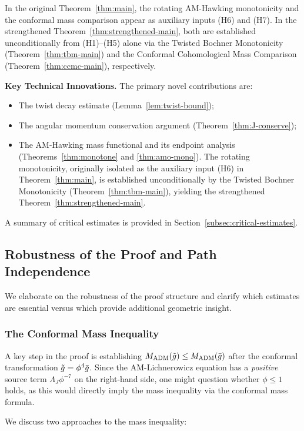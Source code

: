 In the original Theorem~\ref{thm:main}, the rotating AM-Hawking monotonicity and the conformal mass comparison appear as auxiliary inputs (H6) and (H7). In the strengthened Theorem~\ref{thm:strengthened-main}, both are established unconditionally from (H1)--(H5) alone via the Twisted Bochner Monotonicity (Theorem~\ref{thm:tbm-main}) and the Conformal Cohomological Mass Comparison (Theorem~\ref{thm:ccmc-main}), respectively.

\textbf{Key Technical Innovations.} The primary novel contributions are:
\begin{itemize}
    \item The twist decay estimate (Lemma~\ref{lem:twist-bound});
    \item The angular momentum conservation argument (Theorem~\ref{thm:J-conserve});
    \item The AM-Hawking mass functional and its endpoint analysis (Theorems~\ref{thm:monotone} and \ref{thm:amo-mono}). The rotating monotonicity, originally isolated as the auxiliary input (H6) in Theorem~\ref{thm:main}, is established unconditionally by the Twisted Bochner Monotonicity (Theorem~\ref{thm:tbm-main}), yielding the strengthened Theorem~\ref{thm:strengthened-main}.
\end{itemize}
A summary of critical estimates is provided in Section~\ref{subsec:critical-estimates}.

\subsection{Robustness of the Proof and Path Independence}\label{subsec:proof-robustness}

We elaborate on the robustness of the proof structure and clarify which estimates are essential versus which provide additional geometric insight.

\subsubsection{The Conformal Mass Inequality}

A key step in the proof is establishing $M_{\mathrm{ADM}}(\tilde{g}) \leq M_{\mathrm{ADM}}(\bar{g})$ after the conformal transformation $\tilde{g} = \phi^4 \bar{g}$. Since the AM-Lichnerowicz equation has a \emph{positive} source term $\Lambda_J \phi^{-7}$ on the right-hand side, one might question whether $\phi \leq 1$ holds, as this would directly imply the mass inequality via the conformal mass formula.

We discuss two approaches to the mass inequality:

